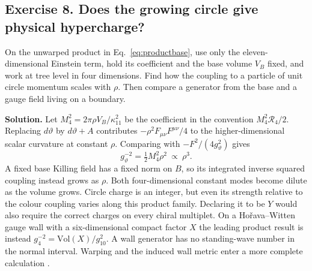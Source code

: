 \documentclass[10pt]{article}
\begin{document}
\subsection{Exercise 8. Does the growing circle give physical hypercharge?}
On the unwarped product in Eq.~\eqref{eq:productbase}, use only the eleven-dimensional Einstein term, hold its coefficient and the base volume $V_B$ fixed, and work at tree level in four dimensions. Find how the coupling to a particle of unit circle momentum scales with $\rho$. Then compare a generator from the base and a gauge field living on a boundary.

\noindent\textbf{Solution.}
Let $M_4^2=2\pi\rho V_B/\kappa_{11}^2$ be the coefficient in the convention $M_4^2\mathcal R_4/2$. Replacing $d\vartheta$ by $d\vartheta+A$ contributes $-\rho^2 F_{\mu\nu}F^{\mu\nu}/4$ to the higher-dimensional scalar curvature at constant $\rho$. Comparing with $-F^2/(4g_\vartheta^2)$ gives
\begin{equation}
 g_\vartheta^{-2}=\tfrac12 M_4^2\rho^2\ \propto\ \rho^3 .
\end{equation}
A fixed base Killing field has a fixed norm on $B$, so its integrated inverse squared coupling instead grows as $\rho$. Both four-dimensional constant modes become dilute as the volume grows. Circle charge is an integer, but even its strength relative to the colour coupling varies along this product family. Declaring it to be $Y$ would also require the correct charges on every chiral multiplet. On a Ho\v{r}ava--Witten gauge wall with a six-dimensional compact factor $X$ the leading product result is instead $g_4^{-2}=\mathrm{Vol}(X)/g_{10}^2$. A wall generator has no standing-wave number in the normal interval. Warping and the induced wall metric enter a more complete calculation \cite{HW1996,SevenMTheory2026}.
\end{document}
